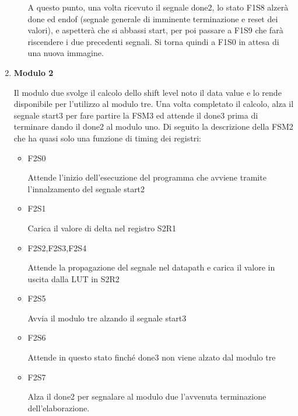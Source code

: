 \documentclass{article}
\begin{document}
\begin{enumerate}
\begin{itemize}
  A questo punto, una volta ricevuto il segnale done2, lo stato F1S8 alzerà done ed endof (segnale generale di imminente terminazione e reset dei valori), e aspetterà che si abbassi start, per poi passare a F1S9 che farà riscendere i due precedenti segnali. Si torna quindi a F1S0 in attesa di una nuova immagine.
\end{itemize}
  
  
    \item \textbf{Modulo 2}
		
		Il modulo due svolge il calcolo dello shift level noto il data value e lo rende disponibile per l'utilizzo al modulo tre. Una volta completato il calcolo, alza il segnale start3 per fare partire la FSM3 ed attende il done3 prima di terminare dando il done2 al modulo uno. Di seguito la descrizione della FSM2 che ha quasi solo una funzione di timing dei registri:
			\begin{itemize}
				\item F2S0 
				
				Attende l'inizio dell'esecuzione del programma che avviene tramite l'innalzamento del segnale start2
				
				\item F2S1
				
				Carica il valore di delta nel registro S2R1
				
				\item F2S2,F2S3,F2S4
				
				Attende la propagazione del segnale nel datapath e carica il valore in uscita dalla LUT in S2R2
				
				\item F2S5
				
				Avvia il modulo tre alzando il segnale start3
				
				\item F2S6
				
				Attende in questo stato finché done3 non viene alzato dal modulo tre
				\item F2S7
				
				Alza il done2 per segnalare al modulo due l'avvenuta terminazione dell'elaborazione.
				

\end{itemize}
\end{enumerate}
\end{document}

